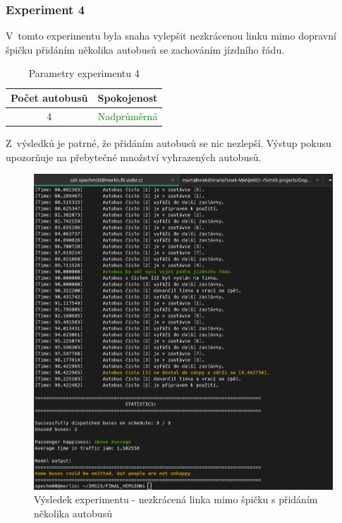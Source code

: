 \documentclass[a4paper]{article}
\begin{document}
            \subsubsection{Experiment 4}
            \label{subsubsec:experiment4}
                V~tomto experimentu byla snaha vylepšit nezkrácenou linku mimo dopravní špičku přidáním několika autobusů se zachováním jízdního řádu. 

                \begin{table}[H]
                	\centering
                	\begin{tabular}{ | c | c |}
                		\hline
                		Počet autobusů & Spokojenost\\
                		\hline
                		\hline
                		4 & \textcolor{green}{Nadprůměrná} \\
                		\hline
                	\end{tabular}
                	\caption{Parametry experimentu 4}
                	\label{tab:experiment4}
                \end{table}

                Z~výsledků je patrné, že přidáním autobusů se nic nezlepší. Výstup pokusu upozorňuje na přebytečné množství vyhrazených autobusů.

                 \begin{figure}[H]
                \includegraphics[scale=0.37, keepaspectratio]{fig/ims_bus4.png}
                \caption{Výsledek experimentu  - nezkrácená linka mimo špičku s přidáním několika autobusů}
                \label{fig:experiment4}
                    \end{figure}
\end{document}
